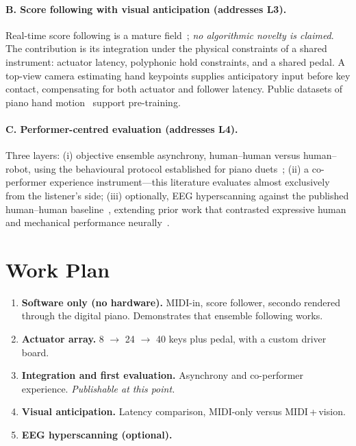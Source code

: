 \documentclass[11pt]{article}
\begin{document}
\paragraph{B. Score following with visual anticipation (addresses L3).}
Real-time score following is a mature field~\cite{raphael2010musicplusone,cont2008antescofo};
\emph{no algorithmic novelty is claimed}. The contribution is its integration under the physical
constraints of a shared instrument: actuator latency, polyphonic hold constraints, and a shared
pedal. A top-view camera estimating hand keypoints supplies anticipatory input before key contact,
compensating for both actuator and follower latency. Public datasets of piano hand
motion~\cite{furelise2024,pianovam2025} support pre-training.

\paragraph{C. Performer-centred evaluation (addresses L4).}
Three layers: (i) objective ensemble asynchrony, human--human versus human--robot, using the
behavioural protocol established for piano duets~\cite{hyperscanning2021}; (ii) a co-performer
experience instrument---this literature evaluates almost exclusively from the listener's side;
(iii) optionally, EEG hyperscanning against the published human--human
baseline~\cite{hyperscanning2021}, extending prior work that contrasted expressive human and
mechanical performance neurally~\cite{chapin2010dynamic}.

\section{Work Plan}
\begin{enumerate}[label=\textbf{P\arabic*.}]
  \item \textbf{Software only (no hardware).} MIDI-in, score follower, secondo rendered through the
        digital piano. Demonstrates that ensemble following works.
  \item \textbf{Actuator array.} 8 $\rightarrow$ 24 $\rightarrow$ 40 keys plus pedal, with a
        custom driver board.
  \item \textbf{Integration and first evaluation.} Asynchrony and co-performer experience.
        \emph{Publishable at this point.}
  \item \textbf{Visual anticipation.} Latency comparison, MIDI-only versus MIDI\,+\,vision.
  \item \textbf{EEG hyperscanning (optional).}
\end{enumerate}
\end{document}
